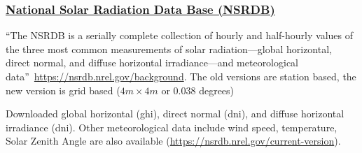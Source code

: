 \documentclass[12pt]{article}
\begin{document}
\subsubsection{\href{http://rredc.nrel.gov/solar/old_data/nsrdb/}{National Solar Radiation Data Base (NSRDB)}}
``The NSRDB is a serially complete collection of hourly and
half-hourly values of the three most common measurements of solar
radiation—global horizontal, direct normal, and diffuse horizontal
irradiance—and meteorological
data''~\url{https://nsrdb.nrel.gov/background}. The old versions are
station based, the new version is grid based ($4m \times 4m$ or 0.038
degrees)

Downloaded global horizontal (ghi), direct normal (dni), and diffuse
horizontal irradiance (dni). Other meteorological data include wind
speed, temperature, Solar Zenith Angle are also available (\url{https://nsrdb.nrel.gov/current-version}).
\end{document}
